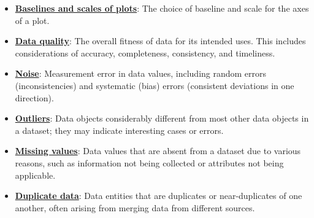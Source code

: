\documentclass{article}%
\begin{document}
\begin{itemize}[leftmargin=*]
\item \href{https://purdue.brightspace.com/d2l/common/assets/pdfjs-d2l-dist/1.0.14-legacy/web/viewer.html?file=\%2Fcontent\%2Fenforced\%2F1095465-WL.202510.CS24200.LE1\%2F10L2-Vis.pdf\%3Fou\%3D1095465\&lang=en-us\&container=d2l-fileviewer-rendered-pdf\&fullscreen=d2l-fileviewer-rendered-pdf-dialog\&height=667#page=66}{\textbf{Baselines and scales of plots}}: The choice of baseline and scale for the axes of a plot.%
\item \href{https://purdue.brightspace.com/d2l/common/assets/pdfjs-d2l-dist/1.0.14-legacy/web/viewer.html?file=\%2Fcontent\%2Fenforced\%2F1095465-WL.202510.CS24200.LE1\%2F12-truth.pdf\%3Fou\%3D1095465\&lang=en-us\&container=d2l-fileviewer-rendered-pdf\&fullscreen=d2l-fileviewer-rendered-pdf-dialog\&height=667#page=2}{\textbf{Data quality}}: The overall fitness of data for its intended uses. This includes considerations of accuracy, completeness, consistency, and timeliness.%
\item \href{https://purdue.brightspace.com/d2l/common/assets/pdfjs-d2l-dist/1.0.14-legacy/web/viewer.html?file=\%2Fcontent\%2Fenforced\%2F1095465-WL.202510.CS24200.LE1\%2F12-truth.pdf\%3Fou\%3D1095465\&lang=en-us\&container=d2l-fileviewer-rendered-pdf\&fullscreen=d2l-fileviewer-rendered-pdf-dialog\&height=667#page=4}{\textbf{Noise}}: Measurement error in data values, including random errors (inconsistencies) and systematic (bias) errors (consistent deviations in one direction).%
\item \href{https://purdue.brightspace.com/d2l/common/assets/pdfjs-d2l-dist/1.0.14-legacy/web/viewer.html?file=\%2Fcontent\%2Fenforced\%2F1095465-WL.202510.CS24200.LE1\%2F12-truth.pdf\%3Fou\%3D1095465\&lang=en-us\&container=d2l-fileviewer-rendered-pdf\&fullscreen=d2l-fileviewer-rendered-pdf-dialog\&height=667#page=5}{\textbf{Outliers}}: Data objects considerably different from most other data objects in a dataset; they may indicate interesting cases or errors.%
\item \href{https://purdue.brightspace.com/d2l/common/assets/pdfjs-d2l-dist/1.0.14-legacy/web/viewer.html?file=\%2Fcontent\%2Fenforced\%2F1095465-WL.202510.CS24200.LE1\%2F12-truth.pdf\%3Fou\%3D1095465\&lang=en-us\&container=d2l-fileviewer-rendered-pdf\&fullscreen=d2l-fileviewer-rendered-pdf-dialog\&height=667#page=6}{\textbf{Missing values}}: Data values that are absent from a dataset due to various reasons, such as information not being collected or attributes not being applicable.%
\item \href{https://purdue.brightspace.com/d2l/common/assets/pdfjs-d2l-dist/1.0.14-legacy/web/viewer.html?file=\%2Fcontent\%2Fenforced\%2F1095465-WL.202510.CS24200.LE1\%2F12-truth.pdf\%3Fou\%3D1095465\&lang=en-us\&container=d2l-fileviewer-rendered-pdf\&fullscreen=d2l-fileviewer-rendered-pdf-dialog\&height=667#page=7}{\textbf{Duplicate data}}: Data entities that are duplicates or near-duplicates of one another, often arising from merging data from different sources.%

\end{itemize}
\end{document}
